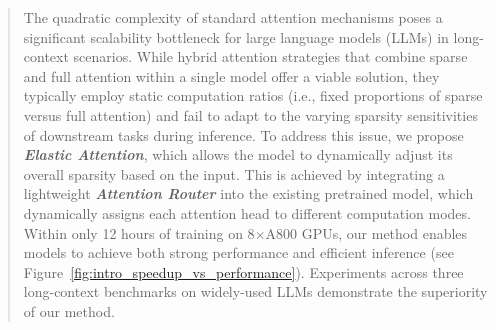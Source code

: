 \documentclass{article}
\theoremstyle{plain}
\theoremstyle{definition}
\theoremstyle{remark}
\begin{document}
\printAffiliationsAndNotice{}  %

\begin{abstract}
The quadratic complexity of standard attention mechanisms poses a significant scalability bottleneck for large language models (LLMs) in long-context scenarios. 
While hybrid attention strategies that combine sparse and full attention within a single model offer a viable solution, they typically employ static computation ratios (i.e., fixed proportions of sparse versus full attention) and fail to adapt to the varying sparsity sensitivities of downstream tasks during inference.
To address this issue, we propose \emph{\textbf{Elastic Attention}}, which allows the model to dynamically adjust its overall sparsity based on the input.
This is achieved by integrating a lightweight \emph{\textbf{Attention Router}} into the existing pretrained model, which dynamically assigns each attention head to different computation modes.
Within only 12 hours of training on 8$\times$A800 GPUs, our method enables models to achieve both strong performance and efficient inference (see Figure~\ref{fig:intro_speedup_vs_performance}).
Experiments across three long-context benchmarks on widely-used LLMs demonstrate the superiority of our method.

\end{abstract}












\newpage
\appendix
\onecolumn



\end{document}
